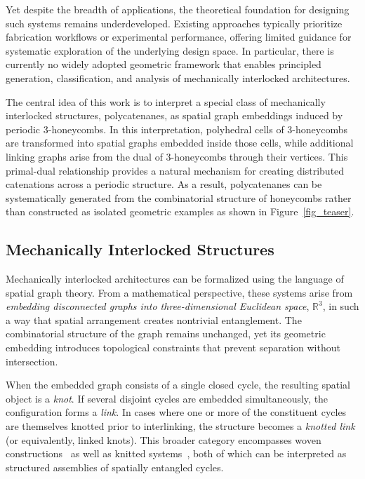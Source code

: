 \documentclass[times,twocolumn,final]{elsarticle}
\begin{document}
Yet despite the breadth of applications, the theoretical foundation for designing such systems remains underdeveloped. Existing approaches typically prioritize fabrication workflows or experimental performance, offering limited guidance for systematic exploration of the underlying design space. In particular, there is currently no widely adopted geometric framework that enables principled generation, classification, and analysis of mechanically interlocked architectures.

The central idea of this work is to interpret a special class of mechanically interlocked structures, polycatenanes, as spatial graph embeddings induced by periodic 3-honeycombs. In this interpretation, polyhedral cells of 3-honeycombs are transformed into spatial graphs embedded inside those cells, while additional linking graphs arise from the dual of 3-honeycombs through their vertices. This primal-dual relationship provides a natural mechanism for creating distributed catenations across a periodic structure. As a result, polycatenanes can be systematically generated from the combinatorial structure of honeycombs rather than constructed as isolated geometric examples as shown in Figure~\ref{fig_teaser}.

\subsection{Mechanically Interlocked Structures}


Mechanically interlocked architectures can be formalized using the language of spatial graph theory. From a mathematical perspective, these systems arise from \emph{embedding disconnected graphs into three-dimensional Euclidean space}, $\mathbb{R}^3$, in such a way that spatial arrangement creates nontrivial entanglement. The combinatorial structure of the graph remains unchanged, yet its geometric embedding introduces topological constraints that prevent separation without intersection.

When the embedded graph consists of a single closed cycle, the resulting spatial object is a \emph{knot}. If several disjoint cycles are embedded simultaneously, the configuration forms a \emph{link}. In cases where one or more of the constituent cycles are themselves knotted prior to interlinking, the structure becomes a \emph{knotted link} (or equivalently, linked knots). This broader category encompasses woven constructions~\cite{akleman2009cyclic,akleman2011cyclic,xing2010single,akleman2020topologically,akleman2015extended} as well as knitted systems~\cite{knittel2020modelling,wadekar2021geometric,niu2025geometric}, both of which can be interpreted as structured assemblies of spatially entangled cycles.
\end{document}
